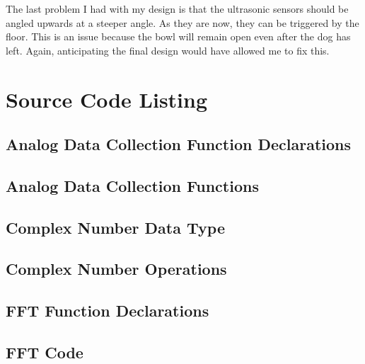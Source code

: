 \documentclass[11pt]{article}           %
\begin{document}
The last problem I had with my design is that the ultrasonic sensors should be
angled upwards at a steeper angle. As they are now, they can be triggered by the
floor. This is an issue because the bowl will remain open even after the dog has
left. Again, anticipating the final design would have allowed me to fix this.

\section{Source Code Listing}
\label{sec:source_code_listing}

\subsection{Analog Data Collection Function Declarations}
\label{sub:data_collection_function_declarations}



\subsection{Analog Data Collection Functions}
\label{sub:analog_data_collection_functions}



\subsection{Complex Number Data Type}
\label{sub:complex_number_data_type}



\subsection{Complex Number Operations}
\label{sub:complex_number_operations}



\subsection{FFT Function Declarations}
\label{sub:fft_function_declarations}



\subsection{FFT Code}
\label{sub:fft_code}
\end{document}

